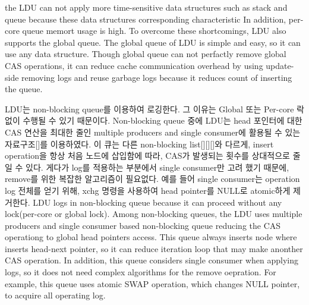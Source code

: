 the LDU can not apply more time-sensitive data structures such as stack and
queue because these data structures corresponding characteristic
In addition, per-core queue memort usage is high.
To overcome these shortcomings, LDU also supports the global queue.
The global queue of LDU is simple and easy, so it can use any data structure.
Though global queue can not perfactly remove global CAS operations, it can
reduce cache communication overhead by using update-side removing
logs and reuse garbage logs because it reduces count of inserting the
queue.
\fi

\ifkor
LDU는  non-blocking queue를 이용하여 로깅한다. 그 이유는 Global 또는 Per-core 락 없이 수행될 수 
있기 때문이다. 
Non-blocking queue 중에 LDU는 head 포인터에 대한 CAS 연산을 최대한 줄인 multiple producers and
single consumer에 활용될 수 있는 자료구조[]를 이용하였다.
이 큐는 다른 non-blocking list[][][]와 다르게, insert operation을 항상 처음 노드에 삽입함에
따라, CAS가 발생되는 횟수를 상대적으로 줄일 수 있다.
게다가 log를 적용하는 부분에서 single consumer만 고려 했기 때문에, remove를 위한 복잡한 알고리즘이 필요없다. 
예를 들어 single consumer는 operation log 전체를 얻기 위해, xchg 명령을 사용하여 head pointer를
NULL로 atomic하게 제거한다. 
\else
LDU logs in non-blocking queue because it can proceed without any lock(per-core
or global lock).
Among non-blocking queues, the LDU uses multiple producers and single consumer
based non-blocking queue reducing the CAS operationg to global head pointers
access.
This queue always inserts node where inserts head-next pointer, so it can
reduce iteration loop that may make anonther CAS operation.
In addition, this queue considers single consumer when applying logs, so it does
not need complex algorithms for the remove oepration.
For example, this queue uses atomic SWAP operation, which changes NULL pointer,
to acquire all operating log.
\fi

